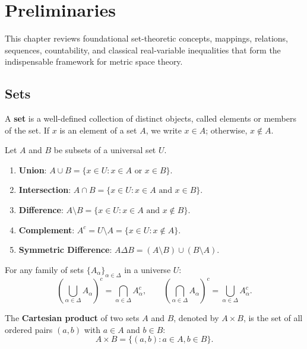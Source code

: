 \chapter{Preliminaries}
\label{chap:preliminaries}

This chapter reviews foundational set-theoretic concepts, mappings, relations, sequences, countability, and classical real-variable inequalities that form the indispensable framework for metric space theory.

\section{Sets}
\label{sec:sets}

A \textbf{set} is a well-defined collection of distinct objects, called elements or members of the set. If $x$ is an element of a set $A$, we write $x \in A$; otherwise, $x \notin A$.

\begin{definition}
Let $A$ and $B$ be subsets of a universal set $U$.
\begin{enumerate}[label=\rm{(\roman*)}]
    \item \textbf{Union}: $A \cup B = \{x \in U : x \in A \text{ or } x \in B\}$.
    \item \textbf{Intersection}: $A \cap B = \{x \in U : x \in A \text{ and } x \in B\}$.
    \item \textbf{Difference}: $A \setminus B = \{x \in U : x \in A \text{ and } x \notin B\}$.
    \item \textbf{Complement}: $A^c = U \setminus A = \{x \in U : x \notin A\}$.
    \item \textbf{Symmetric Difference}: $A \Delta B = (A \setminus B) \cup (B \setminus A)$.
\end{enumerate}
\end{definition}

\begin{theorem}
For any family of sets $\{A_\alpha\}_{\alpha \in \Delta}$ in a universe $U$:
\[
\left( \bigcup_{\alpha \in \Delta} A_\alpha \right)^c = \bigcap_{\alpha \in \Delta} A_\alpha^c, \qquad
\left( \bigcap_{\alpha \in \Delta} A_\alpha \right)^c = \bigcup_{\alpha \in \Delta} A_\alpha^c.
\]
\end{theorem}

\begin{definition}
The \textbf{Cartesian product} of two sets $A$ and $B$, denoted by $A \times B$, is the set of all ordered pairs $(a,b)$ with $a \in A$ and $b \in B$:
\[
A \times B = \{(a,b) : a \in A, b \in B\}.
\]
\end{definition}

